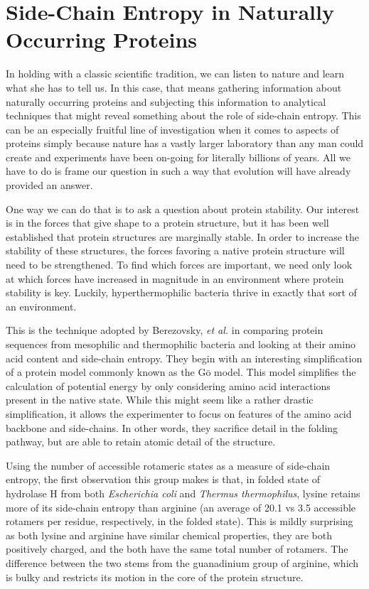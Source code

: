 \section*{Side-Chain Entropy in Naturally Occurring Proteins}
\label{sec:side_chain_entropy_of_x_ray_structures}
In holding with a classic scientific tradition, we can listen to nature and learn what she has to tell us. In this case, that means gathering information about naturally occurring proteins and subjecting this information to analytical techniques that might reveal something about the role of side-chain entropy. This can be an especially fruitful line of investigation when it comes to aspects of proteins simply because nature has a vastly larger laboratory than any man could create and experiments have been on-going for literally billions of years. All we have to do is frame our question in such a way that evolution will have already provided an answer.

One way we can do that is to ask a question about protein stability. Our interest is in the forces that give shape to a protein structure, but it has been well established that protein structures are marginally stable. In order to increase the stability of these structures, the forces favoring a native protein structure will need to be strengthened. To find which forces are important, we need only look at which forces have increased in magnitude in an environment where protein stability is key. Luckily, hyperthermophilic bacteria thrive in exactly that sort of an environment.

This is the technique adopted by Berezovsky, \emph{et al.}\cite{Berezovsky:2005p40} in comparing protein sequences from mesophilic and thermophilic bacteria and looking at their amino acid content and side-chain entropy. They begin with an interesting simplification of a protein model commonly known as the $\mathrm{G\bar{o}}$ model. This model simplifies the calculation of potential energy by only considering amino acid interactions present in the native state. While this might seem like a rather drastic simplification, it allows the experimenter to focus on features of the amino acid backbone and side-chains. In other words, they sacrifice detail in the folding pathway, but are able to retain atomic detail of the structure.

Using the number of accessible rotameric states as a measure of side-chain entropy, the first observation this group makes is that, in folded state of hydrolase H from both \emph{Escherichia coli} and \emph{Thermus thermophilus}, lysine retains more of its side-chain entropy than arginine (an average of 20.1 vs 3.5 accessible rotamers per residue, respectively, in the folded state). This is mildly surprising as both lysine and arginine have similar chemical properties, they are both positively charged, and the both have the same total number of rotamers. The difference between the two stems from the guanadinium group of arginine, which is bulky and restricts its motion in the core of the protein structure.

